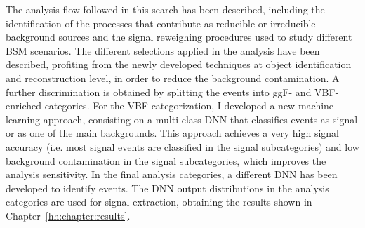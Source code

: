 \documentclass[../main.tex]{subfiles}
\begin{document}
The analysis flow followed in this search has been described, including the identification of the processes that contribute as reducible or irreducible background sources and the signal reweighing procedures used to study different BSM scenarios. The different selections applied in the analysis have been described, profiting from the newly developed techniques at object identification and reconstruction level, in order to reduce the background contamination. A further discrimination is obtained by splitting the events into ggF- and VBF-enriched categories. For the VBF categorization, I developed a new machine learning approach, consisting on a multi-class DNN that classifies events as signal or as one of the main backgrounds. This approach achieves a very high signal accuracy (i.e. most signal events are classified in the signal subcategories) and low background contamination in the signal subcategories, which improves the analysis sensitivity. In the final analysis categories, a different DNN has been developed to identify \hhbbtt{} events. The DNN output distributions in the analysis categories are used for signal extraction, obtaining the results shown in Chapter~\ref{hh:chapter:results}.


%
%
\end{document}
